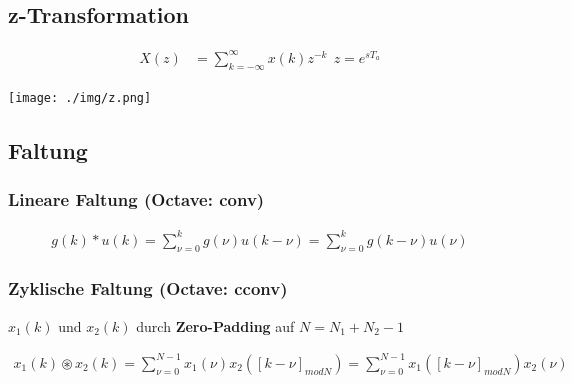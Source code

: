 \documentclass[10pt,a4paper]{article}
\begin{document}
  \subsection{z-Transformation}
  \begin{mdframed}[style=exercise]
    \begin{align}
        X(z) &=\sum_{k=-\infty}^{\infty} x(k)z^{-k} \ \ z=e^{s T_a}
    \end{align}
  \end{mdframed}
  \begin{center}
      \texttt{[image: ./img/z.png]}
  \end{center}
  \subsection{Faltung}
  \subsubsection{Lineare Faltung (\textbf{Octave:} conv)}
  \begin{mdframed}[style=exercise]
    \begin{align}
        g(k)*u(k) = \sum_{\nu =0}^{k} g(\nu) u(k-\nu)= \sum_{\nu =0}^{k} g(k-\nu) u(\nu)
    \end{align}
  \end{mdframed}
  \subsubsection{Zyklische Faltung (\textbf{Octave:} cconv)}
  $x_1(k)$ und $x_2(k)$ durch \textbf{Zero-Padding} auf $N = N_1 +N_2 -1$ 
\scriptsize
  \begin{mdframed}[style=exercise]
    \begin{align}
        x_1(k) \circledast x_2(k) = \sum_{\nu =0}^{N-1} x_1(\nu) x_2([k-\nu]_{modN})= \sum_{\nu =0}^{N-1}x_1([k-\nu]_{modN}) x_2(\nu)
    \end{align}
  \end{mdframed} 
\end{document}
